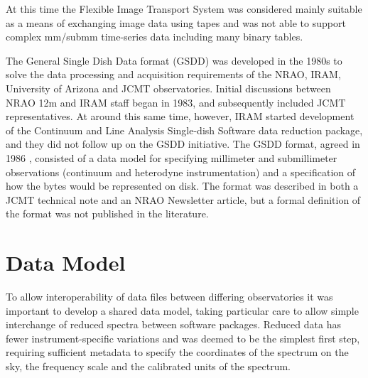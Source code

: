 \documentclass[final,authoryear,5p,times,twocolumn]{elsarticle}
\begin{document}
At this time the Flexible Image Transport System
\citep[FITS;][]{1981A&AS...44..363W,2015Thomas} was considered mainly
suitable as a means of exchanging image data using tapes
\citep{1980SPIE..264..298G} and was not able to support complex
mm/submm time-series data including many binary tables.

The General Single Dish Data format (GSDD) was developed in the 1980s
to solve the data processing and acquisition requirements of the NRAO,
IRAM, University of Arizona and JCMT observatories.
Initial discussions between NRAO 12m and IRAM staff began in 1983, and
subsequently included JCMT representatives. At around this same time,
however, IRAM started development of the Continuum and Line Analysis
Single-dish Software
\citep[][]{2005sf2a.conf..721P} data reduction
package, and they did not follow up on the GSDD initiative.
The GSDD format, agreed
in 1986 \citep[see e.g.,][]{mtdn84,1987NRAO30}, consisted of a data
model for specifying millimeter and submillimeter observations
(continuum and heterodyne instrumentation) and a specification of how
the bytes would be represented on disk.
The format was described in both a JCMT technical note and an NRAO Newsletter
article, but a formal definition of the format was not published in the
literature.

\section{Data Model}

To allow interoperability of data files between differing
observatories it was important to develop a shared data model,
taking particular care to allow simple interchange of reduced spectra
between software packages. Reduced data has fewer instrument-specific
variations and was deemed to be the simplest first step, requiring
sufficient metadata to specify the coordinates of the spectrum on the
sky, the frequency scale and the calibrated
units of the spectrum.
\end{document}
